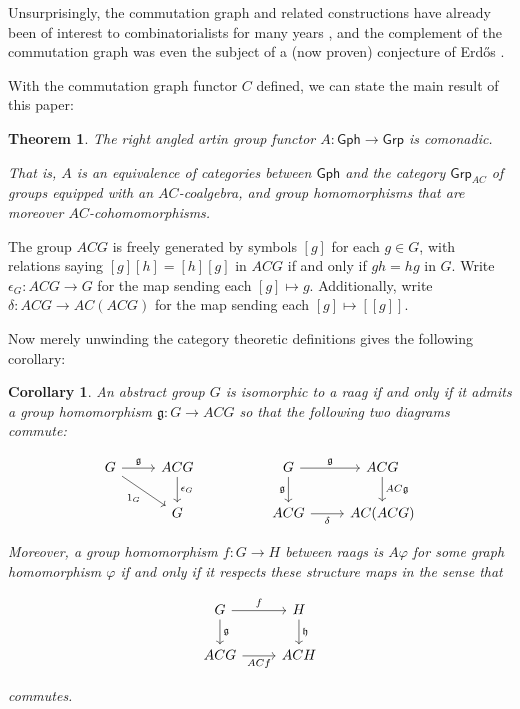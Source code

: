 \documentclass[12pt]{article}
\newtheorem*{thm*}{Theorem}
\newtheorem*{cor*}{Corollary}
\theoremstyle{definition}
\theoremstyle{theorem}
\newcommand{\Gph}{\mathsf{Gph}}
\begin{document}
  Unsurprisingly, the commutation graph and related constructions have already 
  been of interest to combinatorialists for many years 
  \cite{baumeisterCommutingGraphsOdd2009,
  dolinarMaximalDistancesCommuting2012,
  giudiciDiametersCommutingGraphs2010,
  arvindRecognizingCommutingGraph2022,
  cameronGraphsDefinedGroups2022}, and the complement of the commutation 
  graph was even the subject of a (now proven) conjecture of Erd\H{o}s
  \cite{neumannProblemPaulErdos1976}.

  With the commutation graph functor $C$ defined, we can state the main result
  of this paper:

  \begin{thm*}
    The right angled artin group functor $A : \mathsf{Gph} \to \mathsf{Grp}$ is comonadic. 

    That is, $A$ is an equivalence of categories between $\Gph$ and 
    the category $\mathsf{Grp}_{AC}$ of groups equipped with an $AC$-coalgebra,
    and group homomorphisms that are moreover $AC$-cohomomorphisms. 
  \end{thm*}

  The group $ACG$ is freely generated by symbols $[g]$ for each $g \in G$, 
  with relations saying $[g][h] = [h][g]$ in $ACG$ if and only if $gh = hg$ in $G$. 
  Write $\epsilon_G : ACG \to G$ for the map sending each $[g] \mapsto g$.
  Additionally, write $\delta : ACG \to AC(ACG)$ for the map sending each
  $[g] \mapsto [[g]]$.

  Now merely unwinding the category theoretic definitions gives the following corollary:


  \begin{cor*}
    An abstract group $G$ is isomorphic to a raag if and only if it admits a 
    group homomorphism $\mathfrak{g} : G \to ACG$ so that the following two 
    diagrams commute:

    \[
        \begin{tikzcd}
        G & ACG && G   & ACG \\
          & G   && ACG & AC(ACG)
        \arrow["\mathfrak{g}", from=1-1, to=1-2]
        \arrow["{\epsilon_G}", from=1-2, to=2-2]
        \arrow["{1_G}"', from=1-1, to=2-2]
        \arrow["\mathfrak{g}"', from=1-4, to=2-4]
        \arrow["\mathfrak{g}", from=1-4, to=1-5]
        \arrow["\delta"', from=2-4, to=2-5]
        \arrow["AC\mathfrak{g}", from=1-5, to=2-5]
        \end{tikzcd}
    \]

    Moreover, a group homomorphism $f : G \to H$ between raags is 
    $A \varphi$ for some graph homomorphism $\varphi$ if and only if it 
    respects these structure maps in the sense that 

    \[
        \begin{tikzcd}
        G & H \\
        ACG & ACH
        \arrow["\mathfrak{g}", from=1-1, to=2-1]
        \arrow["\mathfrak{h}", from=1-2, to=2-2]
        \arrow["f", from=1-1, to=1-2]
        \arrow["ACf"', from=2-1, to=2-2]
        \end{tikzcd}
    \]    

    commutes.
  \end{cor*}
\end{document}
